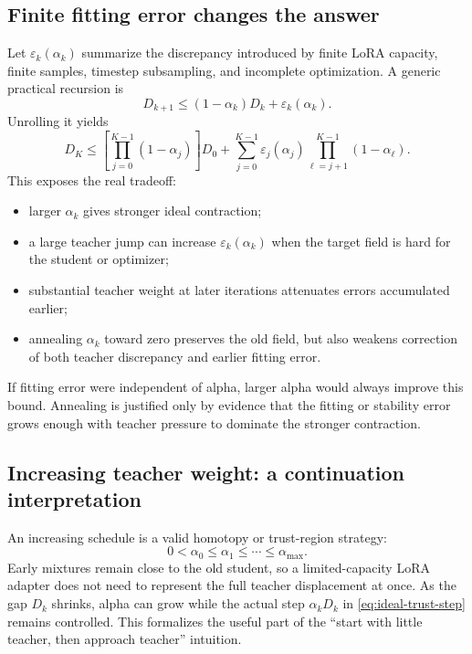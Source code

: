 \documentclass[11pt,a4paper]{article}
\theoremstyle{plain}
\theoremstyle{definition}
\begin{document}
\subsection{Finite fitting error changes the answer}

Let $\varepsilon_k(\alpha_k)$ summarize the discrepancy introduced by finite LoRA capacity,
finite samples, timestep subsampling, and incomplete optimization.  A generic practical
recursion is
\begin{equation}
D_{k+1}
\le
(1-\alpha_k)D_k+\varepsilon_k(\alpha_k).
\label{eq:inexact-scheduled-recursion}
\end{equation}
Unrolling it yields
\begin{equation}
D_K
\le
\left[\prod_{j=0}^{K-1}(1-\alpha_j)\right]D_0
+
\sum_{j=0}^{K-1}
\varepsilon_j(\alpha_j)
\prod_{\ell=j+1}^{K-1}(1-\alpha_\ell).
\label{eq:inexact-scheduled-bound}
\end{equation}
This exposes the real tradeoff:
\begin{itemize}[leftmargin=1.5em]
\item larger $\alpha_k$ gives stronger ideal contraction;
\item a large teacher jump can increase $\varepsilon_k(\alpha_k)$ when the target field is hard
      for the student or optimizer;
\item substantial teacher weight at later iterations attenuates errors accumulated earlier;
\item annealing $\alpha_k$ toward zero preserves the old field, but also weakens correction of
      both teacher discrepancy and earlier fitting error.
\end{itemize}
If fitting error were independent of alpha, larger alpha would always improve this bound.
Annealing is justified only by evidence that the fitting or stability error grows enough with
teacher pressure to dominate the stronger contraction.

\subsection{Increasing teacher weight: a continuation interpretation}

An increasing schedule is a valid homotopy or trust-region strategy:
\begin{equation}
0<\alpha_0\le\alpha_1\le\cdots\le\alpha_{\max}.
\end{equation}
Early mixtures remain close to the old student, so a limited-capacity LoRA adapter does not need
to represent the full teacher displacement at once.  As the gap $D_k$ shrinks, alpha can grow
while the actual step $\alpha_kD_k$ in \eqref{eq:ideal-trust-step} remains controlled.  This
formalizes the useful part of the ``start with little teacher, then approach teacher'' intuition.
\end{document}
